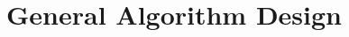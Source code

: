 \documentclass[11pt]{article}
\begin{document}
\def\title{Project Design Doc}

\renewcommand{\labelenumi}{(\alph{enumi})} 
\renewcommand{\theenumi}{(\alph{enumi})} 
\renewcommand{\labelenumii}{\roman{enumii}.}
\renewcommand{\theenumii}{\roman{enumii}.}

\maketitle
\thispagestyle{empty}
\vspace{0.5em}

\section*{General Algorithm Design}
\end{document}
